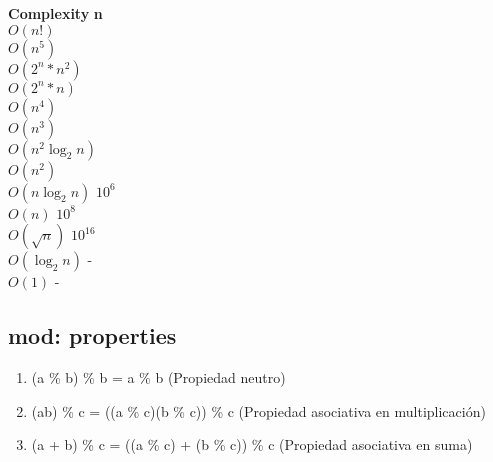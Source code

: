 \documentclass[11pt,letterpaper,twocolumn,twosided]{article}
\begin{document}
\begin{tabbing}
\textbf{Complexity}\hspace{4cm} \=  \textbf{n}\hspace{3cm}   \\ 
$O(n!)$ \\ 
$O(n^{5})$ \\ 
$O(2^{n}*n^{2})$ \\ 
$O(2^{n}*n)$ \\ 
$O(n^{4})$ \\ 
$O(n^{3})$ \\ 
$O(n^{2}\log_{2}n)$ \\ 
$O(n^{2})$ \\ 
$O(n\log_{2}n)$ \> $10^{6}$\\ 
$O(n)$ \> $10^{8}$\\ 
$O(\sqrt{n})$ \> $10^{16}$\\ 
$O(\log_{2}n)$ \> -\\ 
$O(1)$ \> -\\ 
\end{tabbing}

\subsection{mod: properties}

\begin{enumerate}
\item (a \% b) \% b = a \% b (Propiedad neutro)
\item (ab) \% c = ((a \% c)(b \% c)) \% c (Propiedad asociativa en multiplicaci\'on)
\item (a + b) \% c = ((a \% c) + (b \% c)) \% c (Propiedad asociativa en suma)
\end{enumerate}
\end{document}
